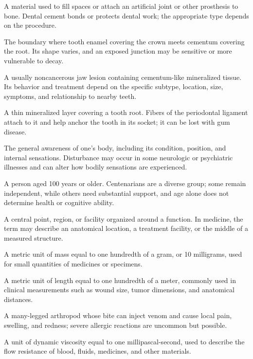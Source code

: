  A material used to fill spaces or attach an artificial joint or other prosthesis to bone. Dental cement bonds or protects dental work; the appropriate type depends on the procedure.

 The boundary where tooth enamel covering the crown meets cementum covering the root. Its shape varies, and an exposed junction may be sensitive or more vulnerable to decay.

 A usually noncancerous jaw lesion containing cementum-like mineralized tissue. Its behavior and treatment depend on the specific subtype, location, size, symptoms, and relationship to nearby teeth.

 A thin mineralized layer covering a tooth root. Fibers of the periodontal ligament attach to it and help anchor the tooth in its socket; it can be lost with gum disease.

 The general awareness of one’s body, including its condition, position, and internal sensations. Disturbance may occur in some neurologic or psychiatric illnesses and can alter how bodily sensations are experienced.

 A person aged 100 years or older. Centenarians are a diverse group; some remain independent, while others need substantial support, and age alone does not determine health or cognitive ability.

 A central point, region, or facility organized around a function. In medicine, the term may describe an anatomical location, a treatment facility, or the middle of a measured structure.

 A metric unit of mass equal to one hundredth of a gram, or 10 milligrams, used for small quantities of medicines or specimens.

 A metric unit of length equal to one hundredth of a meter, commonly used in clinical measurements such as wound size, tumor dimensions, and anatomical distances.


 A many-legged arthropod whose bite can inject venom and cause local pain, swelling, and redness; severe allergic reactions are uncommon but possible.

 A unit of dynamic viscosity equal to one millipascal-second, used to describe the flow resistance of blood, fluids, medicines, and other materials.


